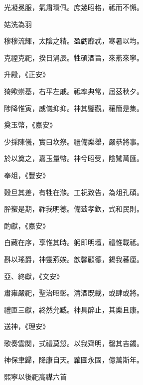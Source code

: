 \begin{pinyinscope}
 光凝冕服，氣肅環佩。庶幾昭格，祗而不懈。



 姑洗為羽



 穆穆流輝，太陰之精。盈虧靡忒，寒暑以均。



 克禋克祀，揆日涓辰。牲碩酒旨，來燕來寧。



 升殿，《正安》



 猗歟崇基，右平左戚。祗率典常，屆茲秋夕。



 陟降惟寅，威儀抑抑。神其鑒觀，穰簡是集。



 奠玉幣，《嘉安》



 少採陳儀，實曰坎祭。禮備樂舉，嚴恭將事。



 於以奠之，嘉玉量幣。神兮昭受，陰騭萬匯。



 奉俎，《豐安》



 穀旦其差，有牲在滌。工祝致告，為俎孔碩。



 肸蠁是期，祚我明德。備茲孝欽，式和民則。



 酌獻，《嘉安》



 白藏在序，享惟其時。躬即明壇，禮惟載祗。



 斟以瑤爵，神靈燕娭。歆馨顧德，錫我蕃厘。



 亞、終獻，《文安》



 肅雍嚴祀，聖治昭彰。清酒既載，或肆或將。



 禮匝三獻，終然允臧。神具醉止，其樂且康。



 送神，《理安》



 歌奏雲闋，式禮莫愆。以我齊明，罄其吉蠲。



 神保聿歸，降康自天。蘿圖永固，億萬斯年。



 熙寧以後祀高禖六首




\end{pinyinscope}
